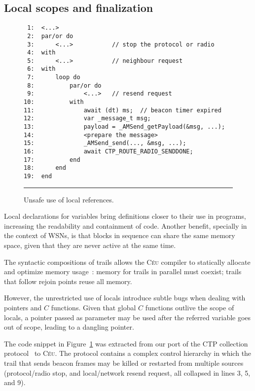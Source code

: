 \documentclass[10pt]{sensys-proc}
\newcommand{\CEU}{\textsc{C\'{e}u}\xspace}
\begin{document}
\subsection{Local scopes and finalization}
\label{sec.ceu.fins}

\begin{figure}[t]
{\small
\begin{verbatim}
 1:  <...>
 2:  par/or do
 3:      <...>           // stop the protocol or radio
 4:  with
 5:      <...>           // neighbour request
 6:  with
 7:      loop do
 8:          par/or do
 9:              <...>   // resend request
10:          with
11:              await (dt) ms;  // beacon timer expired
12:              var _message_t msg;
13:              payload = _AMSend_getPayload(&msg, ...);
14:              <prepare the message>
15:              _AMSend_send(..., &msg, ...);
16:              await CTP_ROUTE_RADIO_SENDDONE;
17:          end
18:      end
19:  end
\end{verbatim}
}
\rule{8.5cm}{0.37pt}
\caption{ Unsafe use of local references.
\label{lst.local}
}
\end{figure}

Local declarations for variables bring definitions closer to their use in 
programs, increasing the readability and containment of code.
Another benefit, specially in the context of WSNs, is that blocks in sequence 
can share the same memory space, given that they are never active at the same 
time.

The syntactic compositions of trails allows the \CEU compiler to statically 
allocate and optimize memory usage~\cite{wsn.osm}:
memory for trails in parallel must coexist;
trails that follow rejoin points reuse all memory.

However, the unrestricted use of locals introduce subtle bugs when dealing with 
pointers and $C$ functions.
Given that global $C$ functions outlive the scope of locals, a pointer passed 
as parameter may be used after the referred variable goes out of scope, leading 
to a dangling pointer.

The code snippet in Figure~\ref{lst.local} was extracted from our port of the 
CTP collection protocol~\cite{wsn.teps} to \CEU.
The protocol contains a complex control hierarchy in which the trail that sends 
beacon frames may be killed or restarted from multiple sources (protocol/radio 
stop, and local/network resend request, all collapsed in lines 3, 5, and 9).
\end{document}
